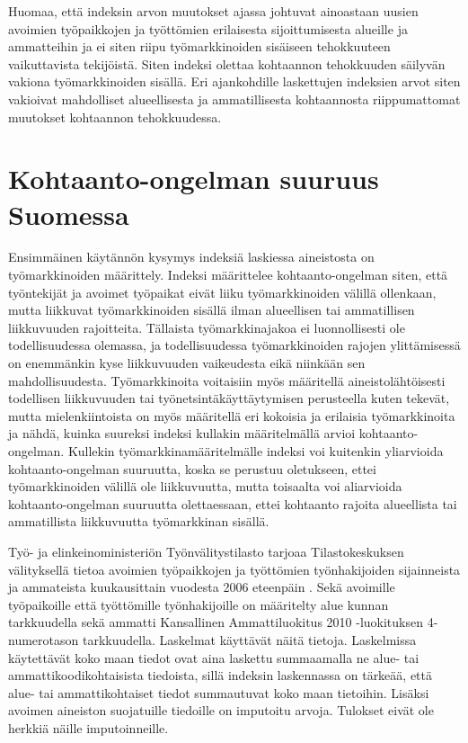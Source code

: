 \documentclass[12pt]{article}
\begin{document}
Huomaa, että indeksin arvon muutokset ajassa johtuvat ainoastaan uusien avoimien työpaikkojen ja työttömien erilaisesta sijoittumisesta alueille ja ammatteihin ja ei siten riipu työmarkkinoiden sisäiseen tehokkuuteen vaikuttavista tekijöistä. Siten indeksi olettaa kohtaannon tehokkuuden säilyvän vakiona työmarkkinoiden sisällä. Eri ajankohdille laskettujen indeksien arvot siten vakioivat mahdolliset alueellisesta ja ammatillisesta kohtaannosta riippumattomat muutokset kohtaannon tehokkuudessa.

\section{Kohtaanto-ongelman suuruus Suomessa} \label{section:kohtaanto-ongelman suuruus suomessa}

Ensimmäinen käytännön kysymys indeksiä laskiessa aineistosta on työmarkkinoiden määrittely. Indeksi määrittelee kohtaanto-ongelman siten, että työntekijät ja avoimet työpaikat eivät liiku työmarkkinoiden välillä ollenkaan, mutta liikkuvat työmarkkinoiden sisällä ilman alueellisen tai ammatillisen liikkuvuuden rajoitteita. Tällaista työmarkkinajakoa ei luonnollisesti ole todellisuudessa olemassa, ja todellisuudessa työmarkkinoiden rajojen ylittämisessä on enemmänkin kyse liikkuvuuden vaikeudesta eikä niinkään sen mahdollisuudesta. Työmarkkinoita voitaisiin myös määritellä aineistolähtöisesti todellisen liikkuvuuden tai työnetsintäkäyttäytymisen perusteella kuten  tekevät, mutta mielenkiintoista on myös määritellä eri kokoisia ja erilaisia työmarkkinoita ja nähdä, kuinka suureksi indeksi kullakin määritelmällä arvioi kohtaanto-ongelman. Kullekin työmarkkinamääritelmälle indeksi voi kuitenkin yliarvioida kohtaanto-ongelman suuruutta, koska se perustuu oletukseen, ettei työmarkkinoiden välillä ole liikkuvuutta, mutta toisaalta voi aliarvioida kohtaanto-ongelman suuruutta olettaessaan, ettei kohtaanto rajoita alueellista tai ammatillista liikkuvuutta työmarkkinan sisällä. 

Työ- ja elinkeinoministeriön Työnvälitystilasto tarjoaa Tilastokeskuksen välityksellä tietoa avoimien työpaikkojen ja työttömien työnhakijoiden sijainneista ja ammateista kuukausittain vuodesta 2006 eteenpäin \cite{svt2011}. Sekä avoimille työpaikoille että työttömille työnhakijoille on määritelty alue kunnan tarkkuudella sekä ammatti Kansallinen Ammattiluokitus 2010 -luokituksen 4-numerotason tarkkuudella. Laskelmat käyttävät näitä tietoja. Laskelmissa käytettävät koko maan tiedot ovat aina laskettu summaamalla ne alue- tai ammattikoodikohtaisista tiedoista, sillä indeksin laskennassa on tärkeää, että alue- tai ammattikohtaiset tiedot summautuvat koko maan tietoihin. Lisäksi avoimen aineiston suojatuille tiedoille on imputoitu arvoja. Tulokset eivät ole herkkiä näille imputoinneille.
\end{document}
